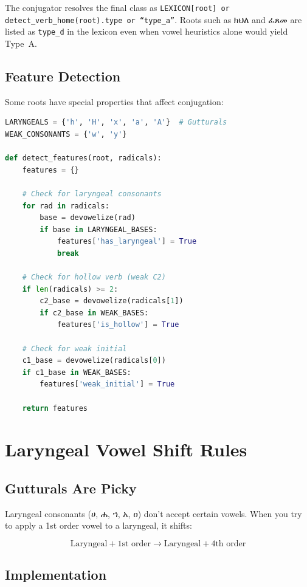 \documentclass[conference]{IEEEtran}
\newcommand{\geez}[1]{{\ethiopicfont #1}}
\begin{document}
The conjugator resolves the final class as \texttt{LEXICON[root] or detect\_verb\_home(root).type or ``type\_a''}. Roots such as \geez{ክህለ} and \geez{ፈጸመ} are listed as \texttt{type\_d} in the lexicon even when vowel heuristics alone would yield Type~A.

\subsection{Feature Detection}

Some roots have special properties that affect conjugation:

\begin{lstlisting}[language=Python]
LARYNGEALS = {'h', 'H', 'x', 'a', 'A'}  # Gutturals
WEAK_CONSONANTS = {'w', 'y'}

def detect_features(root, radicals):
    features = {}
    
    # Check for laryngeal consonants
    for rad in radicals:
        base = devowelize(rad)
        if base in LARYNGEAL_BASES:
            features['has_laryngeal'] = True
            break
    
    # Check for hollow verb (weak C2)
    if len(radicals) >= 2:
        c2_base = devowelize(radicals[1])
        if c2_base in WEAK_BASES:
            features['is_hollow'] = True
    
    # Check for weak initial
    c1_base = devowelize(radicals[0])
    if c1_base in WEAK_BASES:
        features['weak_initial'] = True
    
    return features
\end{lstlisting}

\section{Laryngeal Vowel Shift Rules}

\subsection{Gutturals Are Picky}

Laryngeal consonants (\geez{ሀ, ሐ, ኀ, አ, ዐ}) don't accept certain vowels. When you try to apply a 1st order vowel to a laryngeal, it shifts:

\begin{equation}
\text{Laryngeal} + \text{1st order} \rightarrow \text{Laryngeal} + \text{4th order}
\end{equation}

\subsection{Implementation}
\end{document}
